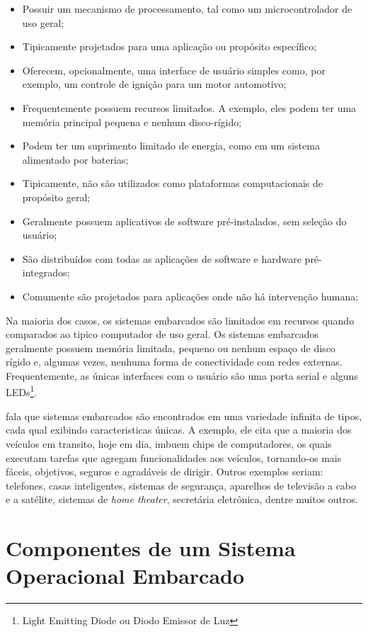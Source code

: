 \begin{itemize}
	\item Possuir um mecanismo de processamento, tal como um microcontrolador de uso geral;
	\item Tipicamente projetados para uma aplicação ou propósito específico;
	\item Oferecem, opcionalmente, uma interface de usuário simples como, por exemplo, um controle de ignição para um motor automotivo;
	\item Frequentemente possuem recursos limitados. A exemplo, eles podem ter uma memória principal pequena e nenhum disco-rígido;
	\item Podem ter um suprimento limitado de energia, como em um sistema alimentado por baterias;
	\item Tipicamente, não são utilizados como plataformas computacionais de propósito geral;
	\item Geralmente possuem aplicativos de software pré-instalados, sem seleção do usuário;
	\item São distribuídos com todas as aplicações de software e hardware pré-integrados;
	\item Comumente são projetados para aplicações onde não há intervenção humana;
\end{itemize}

Na maioria dos casos, os sistemas embarcados são limitados em recursos quando comparados ao tipico computador de uso geral. Os sistemas embarcados geralmente possuem memória limitada, pequeno ou nenhum espaço de disco rígido e, algumas vezes, nenhuma forma de conectividade com redes externas. Frequentemente, as únicas interfaces com o usuário são uma porta serial e alguns LEDs\footnote{Light Emitting Diode ou Diodo Emissor de Luz}\cite{hallinan}.

 fala que sistemas embarcados são encontrados em uma variedade infinita de tipos, cada qual exibindo caracteristicas únicas. A exemplo, ele cita que a maioria dos veículos em transito, hoje em dia, imbuem chips de computadores, os quais executam tarefas que agregam funcionalidades aos veículos, tornando-os mais fáceis, objetivos, seguros e agradáveis de dirigir. Outros exemplos seriam: telefones, casas inteligentes, sistemas de segurança, aparelhos de televisão a cabo e a satélite, sistemas de \emph{home theater}, secretária eletrônica, dentre muitos outros.

\section{Componentes de um Sistema Operacional Embarcado}

